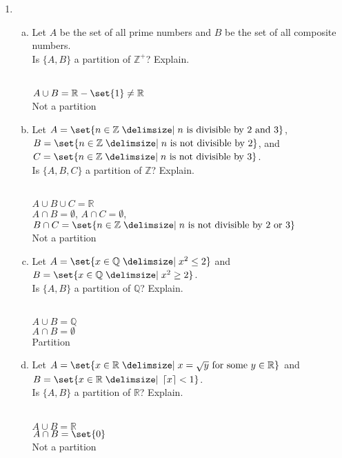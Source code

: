 \documentclass[12pt]{amsart}
\newcommand{\ceil}[1]{\ensuremath{\left\lceil #1\right\rceil}}
\begin{document}
\begin{enumerate}[{\bfseries 1.}]
\newpage
\item\begin{enumerate}[(a)]
	\item Let $A$ be the set of all prime numbers and $B$ be the set of all composite numbers.  \\
		Is $\{A, B\}$ a partition of $\mathbb{Z}^{+}$?  Explain.
		\begin{normalize}
    	\vspace{0.1in}
    	\\ $A \cup B = \mathbb{R} - \set{1} \neq \mathbb{R}$
    	\\ Not a partition
    	\end{normalize}
	\vspace{0.1in}
	\item Let $A=\set{n\in\mathbb{Z}\given n\text{ is divisible by }2\text{ and }3}$, $B=\set{n\in\mathbb{Z}\given n\text{ is not divisible by }2}$, and $C=\set{n\in\mathbb{Z}\given n\text{ is not divisible by }3}$.\\
		Is $\{A, B, C\}$ a partition of $\mathbb{Z}$?  Explain.
		\begin{normalize}
    	\vspace{0.1in}
    	\\ $A \cup B \cup C = \mathbb{R}$
    	\\ $A \cap B = \emptyset$, $A \cap C = \emptyset$, $B \cap C = \set{n \in\mathbb{Z}\given n \text{ is not divisible by }2 \text{ or } 3}$
    	\\ Not a partition
    	\end{normalize}
	\vspace{0.1in}
	\item Let $A=\set{x\in\mathbb{Q}\given x^{2}\leq 2}$ and $B=\set{x\in\mathbb{Q}\given x^{2}\geq 2}$.  \\
		Is $\{A, B\}$ a partition of $\mathbb{Q}$?  Explain.
		\begin{normalize}
    	\vspace{0.1in}
    	\\ $A \cup B = \mathbb{Q}$
    	\\ $A \cap B = \emptyset$
    	\\ Partition
    	\end{normalize}
	\vspace{0.1in}
	\item Let $A=\set{x\in\mathbb{R}\given x=\sqrt{y}\text{ for some }y\in\mathbb{R}}$ and $B=\set{x\in\mathbb{R}\given\ceil{x}<1}$.  \\
		Is $\{A, B\}$ a partition of $\mathbb{R}$?  Explain.
		\begin{normalize}
    	\vspace{0.1in}
    	\\ $A \cup B = \mathbb{R}$
    	\\ $A \cap B = \set{0}$
    	\\ Not a partition
    	\end{normalize}
	\end{enumerate}
\end{enumerate}
\end{document}

